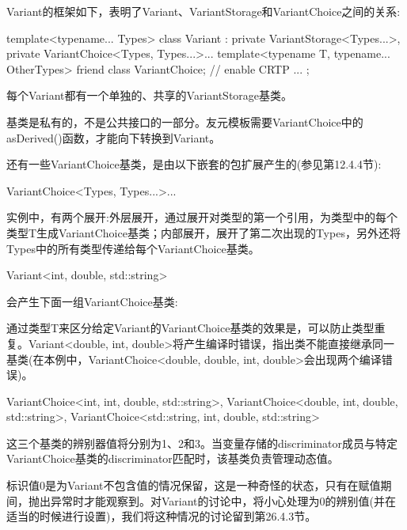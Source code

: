 Variant的框架如下，表明了Variant、VariantStorage和VariantChoice之间的关系:

\begin{cpp}
template<typename... Types>
class Variant
	: private VariantStorage<Types...>,
	private VariantChoice<Types, Types...>...
{
	template<typename T, typename... OtherTypes>
		friend class VariantChoice; // enable CRTP
	...
};
\end{cpp}

每个Variant都有一个单独的、共享的VariantStorage基类。

\begin{notice}
基类是私有的，不是公共接口的一部分。友元模板需要VariantChoice中的asDerived()函数，才能向下转换到Variant。
\end{notice}

还有一些VariantChoice基类，是由以下嵌套的包扩展产生的(参见第12.4.4节):

\begin{cpp}
VariantChoice<Types, Types...>...
\end{cpp}

实例中，有两个展开:外层展开，通过展开对类型的第一个引用，为类型中的每个类型T生成VariantChoice基类；内部展开，展开了第二次出现的Types，另外还将Types中的所有类型传递给每个VariantChoice基类。

\begin{cpp}
Variant<int, double, std::string>
\end{cpp}

会产生下面一组VariantChoice基类:

\begin{notice}
通过类型T来区分给定Variant的VariantChoice基类的效果是，可以防止类型重复。Variant<double, int, double>将产生编译时错误，指出类不能直接继承同一基类(在本例中，VariantChoice<double, double, int, double>会出现两个编译错误)。
\end{notice}

\begin{cpp}
VariantChoice<int, int, double, std::string>,
VariantChoice<double, int, double, std::string>,
VariantChoice<std::string, int, double, std::string>
\end{cpp}

这三个基类的辨别器值将分别为1、2和3。当变量存储的discriminator成员与特定VariantChoice基类的discriminator匹配时，该基类负责管理动态值。

标识值0是为Variant不包含值的情况保留，这是一种奇怪的状态，只有在赋值期间，抛出异常时才能观察到。对Variant的讨论中，将小心处理为0的辨别值(并在适当的时候进行设置)，我们将这种情况的讨论留到第26.4.3节。

